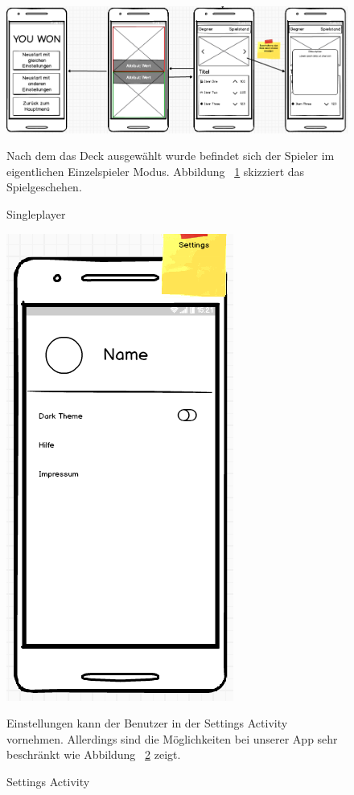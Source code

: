 \documentclass{scrartcl}
\begin{document}
\begin{figure}[!ht]
\begin{center}
	\includegraphics[scale=0.55]{img/mockup_game_process_2.png}
	\caption{Singleplayer}
	\label{singleplayer2}
\end{center}
Nach dem das Deck ausgewählt wurde befindet sich der Spieler im eigentlichen Einzelspieler Modus. Abbildung ~\ref{singleplayer2} skizziert das Spielgeschehen.
\end{figure}

\begin{figure}[!ht]
\begin{center}
	\centering
	\includegraphics[scale=0.6]{img/mockup_settings.png}
	\caption{Settings Activity}
	\label{settings}
\end{center}
Einstellungen kann der Benutzer in der Settings Activity vornehmen. Allerdings sind die Möglichkeiten bei unserer App sehr beschränkt wie Abbildung ~\ref{settings} zeigt.
\end{figure}
\end{document}
